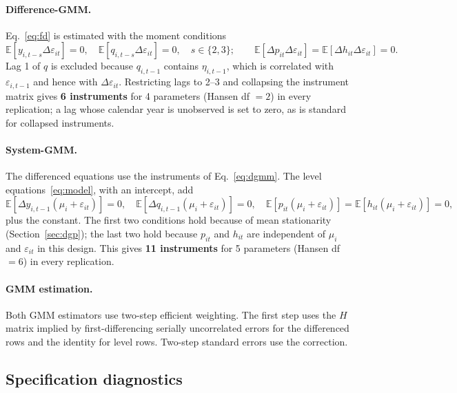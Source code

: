 \documentclass[11pt,a4paper]{article}
\newcommand{\E}{\mathbb{E}}
\begin{document}
\paragraph{Difference-GMM.} Eq.~\eqref{eq:fd} is estimated with the moment conditions
\begin{equation}\label{eq:dgmm}
\E[y_{i,t-s}\Delta\varepsilon_{it}]=0,\quad \E[q_{i,t-s}\Delta\varepsilon_{it}]=0,\quad s\in\{2,3\};\qquad \E[\Delta p_{it}\Delta\varepsilon_{it}]=\E[\Delta h_{it}\Delta\varepsilon_{it}]=0.
\end{equation}
Lag 1 of $q$ is excluded because $q_{i,t-1}$ contains $\eta_{i,t-1}$, which is correlated with $\varepsilon_{i,t-1}$ and hence with $\Delta\varepsilon_{it}$. Restricting lags to 2--3 and collapsing the instrument matrix \citep{Roodman2009b} gives \textbf{6 instruments} for 4 parameters (Hansen df $=2$) in every replication; a lag whose calendar year is unobserved is set to zero, as is standard for collapsed instruments.

\paragraph{System-GMM.} The differenced equations use the instruments of Eq.~\eqref{eq:dgmm}. The level equations~\eqref{eq:model}, with an intercept, add
\begin{equation}\label{eq:sgmm}
\E[\Delta y_{i,t-1}(\mu_i+\varepsilon_{it})]=0,\quad \E[\Delta q_{i,t-1}(\mu_i+\varepsilon_{it})]=0,\quad \E[p_{it}(\mu_i+\varepsilon_{it})]=\E[h_{it}(\mu_i+\varepsilon_{it})]=0,
\end{equation}
plus the constant. The first two conditions hold because of mean stationarity (Section~\ref{sec:dgp}); the last two hold because $p_{it}$ and $h_{it}$ are independent of $\mu_i$ and $\varepsilon_{it}$ in this design. This gives \textbf{11 instruments} for 5 parameters (Hansen df $=6$) in every replication.

\paragraph{GMM estimation.} Both GMM estimators use two-step efficient weighting. The first step uses the $H$ matrix implied by first-differencing serially uncorrelated errors for the differenced rows and the identity for level rows. Two-step standard errors use the \citet{Windmeijer2005} correction.

\subsection{Specification diagnostics}
\end{document}
